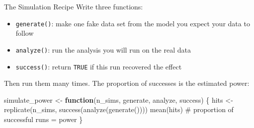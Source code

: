 \documentclass[
  ignorenonframetext,
  aspectratio=169,
]{beamer}
\newenvironment{Shaded}{\begin{snugshade}}{\end{snugshade}}
\newcommand{\CommentTok}[1]{\textcolor[rgb]{0.37,0.37,0.37}{#1}}
\newcommand{\ControlFlowTok}[1]{\textcolor[rgb]{0.00,0.23,0.31}{\textbf{#1}}}
\newcommand{\FunctionTok}[1]{\textcolor[rgb]{0.28,0.35,0.67}{#1}}
\newcommand{\NormalTok}[1]{\textcolor[rgb]{0.00,0.23,0.31}{#1}}
\newcommand{\OtherTok}[1]{\textcolor[rgb]{0.00,0.23,0.31}{#1}}
\providecommand{\tightlist}{%
  \setlength{\itemsep}{0pt}\setlength{\parskip}{0pt}}
\begin{document}
\begin{frame}[fragile]{The Simulation Recipe}
\label{the-simulation-recipe}
\small Write three functions:

\begin{itemize}
\tightlist
\item
  \texttt{generate()}: make one fake data set from the model you expect
  your data to follow
\item
  \texttt{analyze()}: run the analysis you will run on the real data
\item
  \texttt{success()}: return \texttt{TRUE} if this run recovered the
  effect
\end{itemize}

Then run them many times. The proportion of successes is the estimated
power:

\begin{Shaded}
\begin{Highlighting}[]
\NormalTok{simulate\_power }\OtherTok{\textless{}{-}} \ControlFlowTok{function}\NormalTok{(n\_sims, generate, analyze, success) \{}
\NormalTok{  hits }\OtherTok{\textless{}{-}} \FunctionTok{replicate}\NormalTok{(n\_sims, }\FunctionTok{success}\NormalTok{(}\FunctionTok{analyze}\NormalTok{(}\FunctionTok{generate}\NormalTok{())))}
  \FunctionTok{mean}\NormalTok{(hits) }\CommentTok{\# proportion of successful runs = power}
\NormalTok{\}}
\end{Highlighting}
\end{Shaded}
\end{frame}
\end{document}
